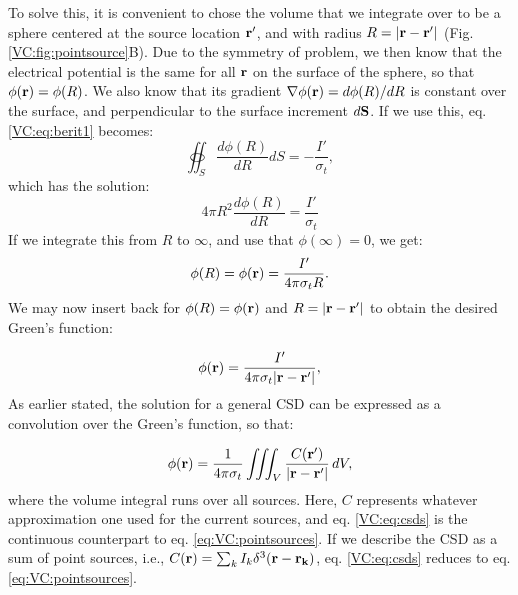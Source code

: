 To solve this, it is convenient to chose the volume that we integrate over to be a sphere centered at the source location ${\bf r'}$, and with radius $R = |{\bf r-r'}|$ (Fig. \ref{VC:fig:pointsource}B). Due to the symmetry of problem, we then know that the electrical potential is the same for all ${\bf r}$ on the surface of the sphere, so that $\phi({\bf r}) = \phi(R)$. We also know that its gradient $\nabla\phi({\bf r}) = d\phi(R)/dR$ is constant over the surface, and perpendicular to the surface increment $d{\bf S}$. If we use this, eq. \ref{VC:eq:berit1} becomes:
\begin{equation}
\oiint_{S} \frac{d\phi(R)}{dR} d{S}  = - \frac{I'}{\sigma_t},
\label{VC:eq:berit1ogenhalv}
\end{equation}
which has the solution:
\begin{equation}
4\pi R^2 \frac{d\phi(R)}{dR} = \frac{I'}{\sigma_t}
\label{VC:eq:berit2}
\end{equation}
If we integrate this from $R$ to $\infty$, and use that $\phi(\infty) = 0$, we get:
\begin{equation}
\phi(R) = \phi({\bf r}) = \frac{I'}{4\pi \sigma_t R}.
\label{VC:eq:berit3}
\end{equation}
We may now insert back for $\phi(R)= \phi({\bf r})$ and $R = |{\bf r-r'}|$ to obtain the desired Green's function:

\begin{equation}
\phi({\bf r})= \frac{I'}{4\pi \sigma_t |{\bf r-r'}|},
\label{VC:eq:berit4}
\end{equation}
As earlier stated, the solution for a general CSD can be expressed as a convolution over the Green's function, so that:

\begin{equation}
\phi({\bf r}) = \frac{1}{4\pi \sigma_t}\iiint_V \frac{C({\bf r'})}{|{\bf r}-{\bf r'}|} \,dV,
\label{VC:eq:csds}
\end{equation}
where the volume integral runs over all sources. Here, $C$ represents whatever approximation one used for the current sources, and eq. \ref{VC:eq:csds} is the continuous counterpart to eq. \ref{eq:VC:pointsources}. If we describe the CSD as a sum of point sources, i.e.,  $C({\bf r}) = \sum_k I_k \delta^3({\bf r} - {\bf r_k})$, eq. \ref{VC:eq:csds} reduces to eq.\ref{eq:VC:pointsources}.


